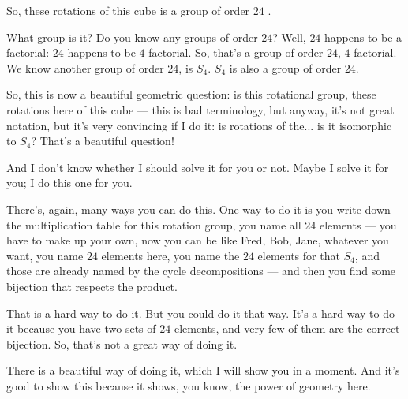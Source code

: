 \begin{speech}[00:36:52 - 00:38:42]
So, these rotations of this cube is a group of order $24$ .

What group is it? Do you know any groups of order $24$? Well, $24$ happens to be a factorial: $24$ happens to be $4$ factorial. So, that's a group of order $24$, $4$ factorial. We know another group of order $24$, is $S_4$. $S_4$ is also a group of order $24$.

So, this is now a beautiful geometric question: is this rotational group, these rotations here of this cube --- this is bad terminology, but anyway, it's not great notation, but it's very convincing if I do it: is rotations of the... is it isomorphic to $S_4$?  That's a beautiful question!

And I don't know whether I should solve it for you or not. Maybe I solve it for you; I do this one for you.

There's, again, many ways you can do this. One way to do it is you write down the multiplication table for this rotation group, you name all $24$ elements --- you have to make up your own, now you can be like Fred, Bob, Jane, whatever you want, you name $24$ elements here, you name the $24$ elements for that $S_4$, and those are already named by the cycle decompositions --- and then you find some bijection that respects the product.

That is a hard way to do it. But you could do it that way. It's a hard way to do it because you have two sets of $24$ elements, and very few of them are the correct bijection. So, that's not a great way of doing it.

There is a beautiful way of doing it, which I will show you in a moment. And it's good to show this because it shows, you know, the power of geometry here. 
\end{speech}

